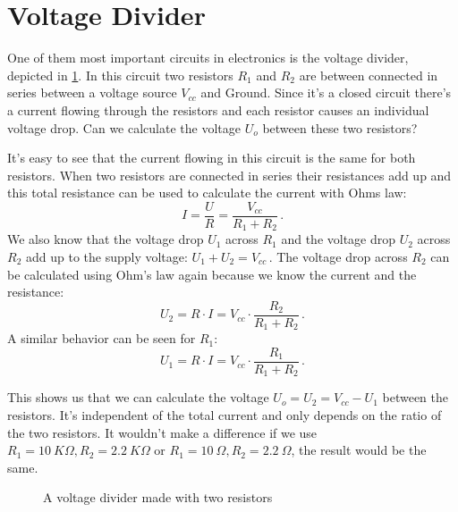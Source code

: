 \section{Voltage Divider}

One of them most important circuits in electronics is the voltage divider, depicted in \cref{fig:simple-voltage-divider}. In this circuit two resistors $R_1$ and $R_2$ are between connected in series between a voltage source $V_{cc}$ and Ground. Since it's a closed circuit there's a current flowing through the resistors and each resistor causes an individual voltage drop. Can we calculate the voltage $U_o$ between these two resistors?

It's easy to see that the current flowing in this circuit is the same for both resistors. When two resistors are connected in series their resistances add up and this total resistance can be used to calculate the current with Ohms law:
\begin{equation*}
	I = \frac{U}{R} = \frac{V_{cc}}{R_1 + R_2}\,.
\end{equation*}
We also know that the voltage drop $U_1$ across $R_1$ and the voltage drop $U_2$ across $R_2$ add up to the supply voltage: $U_1 + U_2 = V_{cc}\,$. The voltage drop across $R_2$ can be calculated using Ohm's law again because we know the current and the resistance:
\begin{equation*}
	U_2 = R \cdot I = V_{cc} \cdot \frac{R_2}{R_1 + R_2}\,.
\end{equation*}
A similar behavior can be seen for $R_1$:
\begin{equation*}
	U_1 = R \cdot I = V_{cc} \cdot \frac{R_1}{R_1 + R_2}\,.
\end{equation*}

This shows us that we can calculate the voltage $U_o = U_2 = V_{cc} - U_1$ between the resistors. It's independent of the total current and only depends on the ratio of the two resistors. It wouldn't make a difference if we use $R_1 = \SI{10}{K\Omega}, R_2 = \SI{2,2}{K\Omega}$ or $R_1 = \SI{10}{\Omega}, R_2 = \SI{2,2}{\Omega}$, the result would be the same.


\begin{figure}[htb]
	\centering
	\caption{A voltage divider made with two resistors}
	\label{fig:simple-voltage-divider}
\end{figure}


